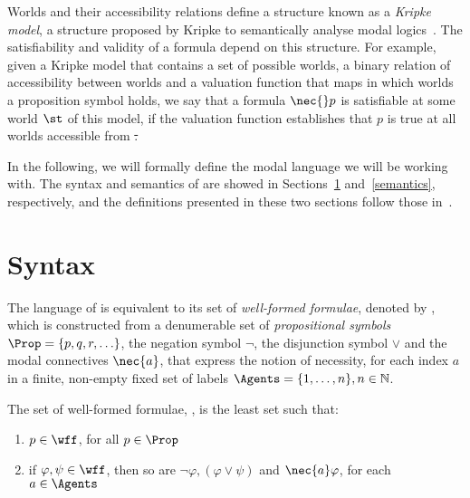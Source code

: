 Worlds and their accessibility relations define a structure known as a
\emph{Kripke model}, a structure proposed by Kripke to semantically analyse
modal logics~\cite{kripke:i}.  The satisfiability and validity of a formula
depend on this structure. For example, given a Kripke model that contains a set
of possible worlds, a binary relation of accessibility between worlds and a
valuation function that maps in which worlds a proposition symbol holds, we say
that a formula $\nec{}p$ is satisfiable at some world $\st$ of this model, if
the valuation function establishes that $p$ is true at all worlds accessible
from \st.

In the following, we will formally define the modal language we will be working with. The
syntax and semantics of  are showed in Sections~\ref{syntax}
and~\ref{semantics}, respectively, and the definitions presented in these two
sections follow those in~\cite{journals/jal/NalonD07}.

\section{Syntax}
\label{syntax}

The language of  is equivalent to its set of \emph{well-formed
formulae}, denoted by \wff, which is constructed from a denumerable set of
\emph{propositional symbols} $\Prop = \{p, q, r, \ldots\}$, the negation
symbol $\neg$, the disjunction symbol $\lor$ and the modal connectives
$\nec{a}$, that express the notion of necessity, for each index $a$
in a finite, non-empty fixed set of labels $\Agents = \{1, \ldots, n\}, n
\in \mathbb{N}$.

\begin{definition}
\label{def:wff}
    The set of well-formed formulae, \wff, is the least set such that:
    \begin{enumerate}
        \item $p \in \wff$, for all $p \in \Prop$
            \vspace{.2ex}
        \item if $\varphi, \psi \in \wff$, then so are $\neg \varphi, (\varphi
            \lor \psi)$ and $\nec{a} \varphi$, for each $a \in \Agents$
    \end{enumerate}
\end{definition}

